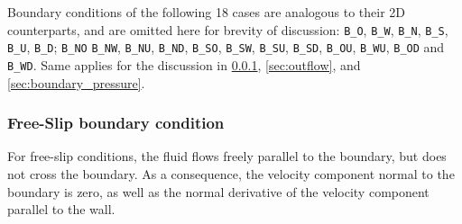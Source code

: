 \documentclass[a4paper, 12pt]{article}
\begin{document}
Boundary conditions of the following 18 cases are analogous to their 2D counterparts, and are omitted here for brevity of discussion: \texttt{B\_O}, \texttt{B\_W}, \texttt{B\_N}, \texttt{B\_S}, \texttt{B\_U}, \texttt{B\_D}; \texttt{B\_NO} \texttt{B\_NW}, \texttt{B\_NU}, \texttt{B\_ND}, \texttt{B\_SO}, \texttt{B\_SW}, \texttt{B\_SU}, \texttt{B\_SD}, \texttt{B\_OU}, \texttt{B\_WU}, \texttt{B\_OD} and \texttt{B\_WD}. Same applies for the discussion in  \ref{sec:free-slip}, \ref{sec:outflow}, and \ref{sec:boundary_pressure}.

\subsubsection{Free-Slip boundary condition}\label{sec:free-slip}
For free-slip conditions, the fluid flows freely parallel to the boundary, but does not cross the boundary. As a consequence, the velocity component normal to the boundary is zero, as well as the normal derivative of the velocity component parallel to the wall. 
%
%
\end{document}
